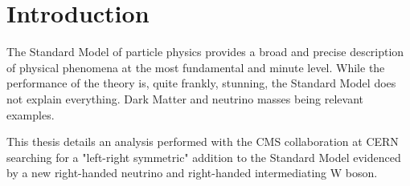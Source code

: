 \chapter{Introduction}
\label{ch:intro}
The Standard Model of particle physics provides a broad and precise description of physical phenomena at the most fundamental and minute level.  While the performance of the theory is, quite frankly, stunning, the Standard Model does not explain everything.  Dark Matter and neutrino masses being relevant examples.

This thesis details an analysis performed with the CMS collaboration at CERN searching for a "left-right symmetric" addition to the Standard Model evidenced by a new right-handed neutrino and right-handed intermediating W boson.

